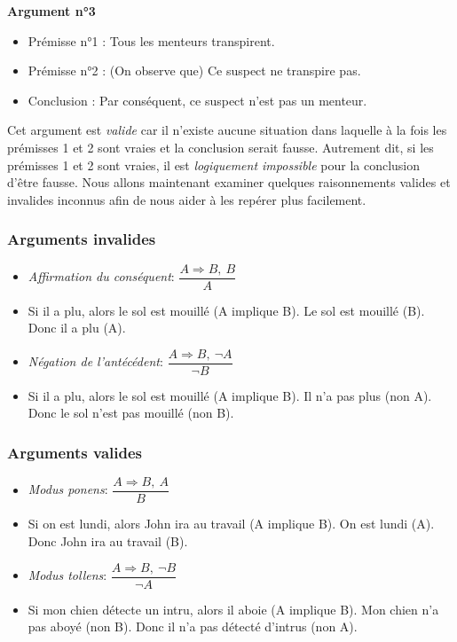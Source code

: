 \documentclass[
  a4paper,11pt,twoside,onecolumn,openright,final,oldfontcommands]{memoir}
\providecommand{\tightlist}{%
  \setlength{\itemsep}{0pt}\setlength{\parskip}{0pt}}
\theoremstyle{definition}
\theoremstyle{definition}
\theoremstyle{definition}
\theoremstyle{remark}
\begin{document}
\textbf{Argument n°3}

\begin{itemize}
\tightlist
\item
  Prémisse n°1 : Tous les menteurs transpirent.
\item
  Prémisse n°2 : (On observe que) Ce suspect ne transpire pas.
\item
  Conclusion : Par conséquent, ce suspect n'est pas un menteur.
\end{itemize}

Cet argument est \emph{valide} car il n'existe aucune situation dans laquelle à la fois les prémisses 1 et 2 sont vraies et la conclusion serait fausse. Autrement dit, si les prémisses 1 et 2 sont vraies, il est \emph{logiquement impossible} pour la conclusion d'être fausse. Nous allons maintenant examiner quelques raisonnements valides et invalides inconnus afin de nous aider à les repérer plus facilement.

\hypertarget{arguments-invalides}{%
\subsubsection{Arguments invalides}\label{arguments-invalides}}

\begin{itemize}
\item
  \emph{Affirmation du conséquent}: \(\dfrac{A \Rightarrow B, \ B}{A}\)
\item
  Si il a plu, alors le sol est mouillé (A implique B). Le sol est mouillé (B). Donc il a plu (A).
\item
  \emph{Négation de l'antécédent}: \(\dfrac{A \Rightarrow B, \ \neg A}{\neg B}\)
\item
  Si il a plu, alors le sol est mouillé (A implique B). Il n'a pas plus (non A). Donc le sol n'est pas mouillé (non B).
\end{itemize}

\hypertarget{arguments-valides}{%
\subsubsection{Arguments valides}\label{arguments-valides}}

\begin{itemize}
\item
  \emph{Modus ponens}: \(\dfrac{A \Rightarrow B, \ A}{B}\)
\item
  Si on est lundi, alors John ira au travail (A implique B). On est lundi (A). Donc John ira au travail (B).
\item
  \emph{Modus tollens}: \(\dfrac{A \Rightarrow B, \ \neg B}{\neg A}\)
\item
  Si mon chien détecte un intru, alors il aboie (A implique B). Mon chien n'a pas aboyé (non B). Donc il n'a pas détecté d'intrus (non A).
\end{itemize}
\end{document}
